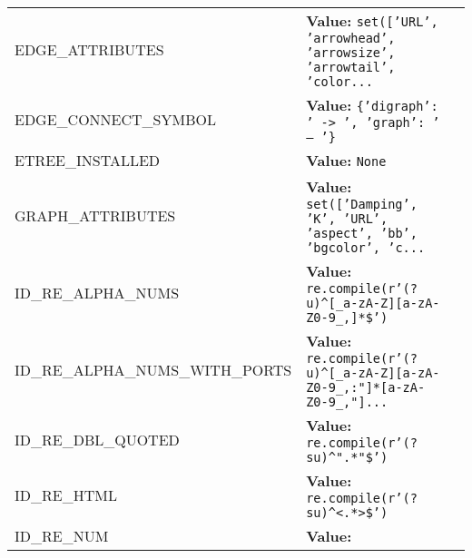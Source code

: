 \begin{longtable}{|p{\varnamewidth}|p{\vardescrwidth}|l}
\cline{1-2}
\raggedright E\-D\-G\-E\-\_\-A\-T\-T\-R\-I\-B\-U\-T\-E\-S\- & \raggedright \textbf{Value:} 
{\tt \texttt{set([}\texttt{'}\texttt{URL}\texttt{'}\texttt{, }\texttt{'}\texttt{arrowhead}\texttt{'}\texttt{, }\texttt{'}\texttt{arrowsize}\texttt{'}\texttt{, }\texttt{'}\texttt{arrowtail}\texttt{'}\texttt{, }\texttt{'}\texttt{color}\texttt{...}}&\\
\cline{1-2}
\raggedright E\-D\-G\-E\-\_\-C\-O\-N\-N\-E\-C\-T\-\_\-S\-Y\-M\-B\-O\-L\- & \raggedright \textbf{Value:} 
{\tt \texttt{\{}\texttt{'}\texttt{digraph}\texttt{'}\texttt{: }\texttt{'}\texttt{ -{\textgreater} }\texttt{'}\texttt{, }\texttt{'}\texttt{graph}\texttt{'}\texttt{: }\texttt{'}\texttt{ -- }\texttt{'}\texttt{\}}}&\\
\cline{1-2}
\raggedright E\-T\-R\-E\-E\-\_\-I\-N\-S\-T\-A\-L\-L\-E\-D\- & \raggedright \textbf{Value:} 
{\tt None}&\\
\cline{1-2}
\raggedright G\-R\-A\-P\-H\-\_\-A\-T\-T\-R\-I\-B\-U\-T\-E\-S\- & \raggedright \textbf{Value:} 
{\tt \texttt{set([}\texttt{'}\texttt{Damping}\texttt{'}\texttt{, }\texttt{'}\texttt{K}\texttt{'}\texttt{, }\texttt{'}\texttt{URL}\texttt{'}\texttt{, }\texttt{'}\texttt{aspect}\texttt{'}\texttt{, }\texttt{'}\texttt{bb}\texttt{'}\texttt{, }\texttt{'}\texttt{bgcolor}\texttt{'}\texttt{, }\texttt{'}\texttt{c}\texttt{...}}&\\
\cline{1-2}
\raggedright I\-D\-\_\-R\-E\-\_\-A\-L\-P\-H\-A\-\_\-N\-U\-M\-S\- & \raggedright \textbf{Value:} 
{\tt re.compile(r'\texttt{(?u)}{\textasciicircum}\texttt{[}\_a\texttt{-}zA\texttt{-}Z\texttt{]}\texttt{[}a\texttt{-}zA\texttt{-}Z0\texttt{-}9\_,\texttt{]}\texttt{*}\$')}&\\
\cline{1-2}
\raggedright I\-D\-\_\-R\-E\-\_\-A\-L\-P\-H\-A\-\_\-N\-U\-M\-S\-\_\-W\-I\-T\-H\-\_\-P\-O\-R\-T\-S\- & \raggedright \textbf{Value:} 
{\tt re.compile(r'\texttt{(?u)}{\textasciicircum}\texttt{[}\_a\texttt{-}zA\texttt{-}Z\texttt{]}\texttt{[}a\texttt{-}zA\texttt{-}Z0\texttt{-}9\_,:"\texttt{]}\texttt{*}\texttt{[}a\texttt{-}zA\texttt{-}Z0\texttt{-}9\_,"\texttt{]}\texttt{...}}&\\
\cline{1-2}
\raggedright I\-D\-\_\-R\-E\-\_\-D\-B\-L\-\_\-Q\-U\-O\-T\-E\-D\- & \raggedright \textbf{Value:} 
{\tt re.compile(r'\texttt{(?su)}{\textasciicircum}".\texttt{*}"\$')}&\\
\cline{1-2}
\raggedright I\-D\-\_\-R\-E\-\_\-H\-T\-M\-L\- & \raggedright \textbf{Value:} 
{\tt re.compile(r'\texttt{(?su)}{\textasciicircum}{\textless}.\texttt{*}{\textgreater}\$')}&\\
\cline{1-2}
\raggedright I\-D\-\_\-R\-E\-\_\-N\-U\-M\- & \raggedright \textbf{Value:} 

\end{longtable}
